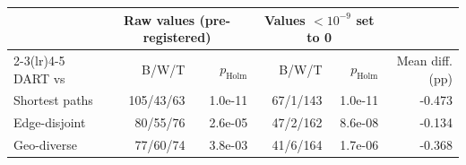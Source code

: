 \begin{tabular}{lrrrrr}
\toprule
 & \multicolumn{2}{c}{Raw values (pre-registered)} & \multicolumn{2}{c}{Values $<10^{-9}$ set to 0} & \\
\cmidrule(lr){2-3}\cmidrule(lr){4-5}
DART vs & B/W/T & $p_{\mathrm{Holm}}$ & B/W/T & $p_{\mathrm{Holm}}$ & Mean diff. (pp) \\
\midrule
Shortest paths & 105/43/63 & 1.0e-11 & 67/1/143 & 1.0e-11 & -0.473 \\
Edge-disjoint & 80/55/76 & 2.6e-05 & 47/2/162 & 8.6e-08 & -0.134 \\
Geo-diverse & 77/60/74 & 3.8e-03 & 41/6/164 & 1.7e-06 & -0.368 \\
\bottomrule
\end{tabular}
